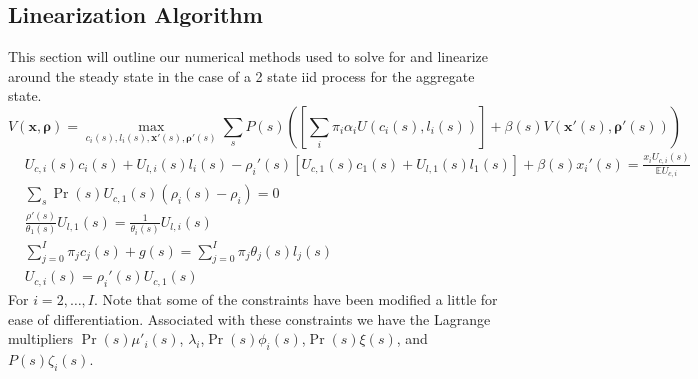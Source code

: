 \documentclass[thmsb,11pt]{article}
\begin{document}
\subsection{Linearization Algorithm}\label{apndx: numerical methods}
This section will outline our numerical methods used to solve for and linearize around the steady state in the case of a 2 state iid process for the aggregate state.
\begin{equation}
	V(\bm x,\bm \rho) = \max_{c_i(s),l_i(s),\bm x'(s),\bm\rho'(s)} \sum_s P(s)\left(\left[\sum_i\pi_i \alpha_i U(c_i(s),l_i(s))\right] + \beta(s) V(\bm x'(s),\bm \rho'(s))\right)\label{eq.obj}
\end{equation}
\begin{subequations}
\begin{align}
	&U_{c,i}(s)c_i(s)+U_{l,i}(s)l_i(s) - \rho_i'(s)\left[U_{c,1}(s)c_1(s)+U_{l,1}(s)l_1(s)\right]+ \beta(s)x_i'(s) = \frac{x_i U_{c,i}(s)}{\mathbb{E} U_{c,i}}\label{eq.imp_con}\\
	&\sum_s \Pr(s) U_{c,1}(s)(\rho_i(s) -\rho_i) = 0\\
	&\frac{\rho'(s)}{\theta_1(s)}U_{l,1}(s) = \frac{1}{\theta_i(s)}U_{l,i}(s)\\
	& \sum_{j=0}^I\pi_j c_j(s)  + g(s) = \sum_{j=0}^{I} \pi_j\theta_j(s)l_j(s)\\
	& U_{c,i}(s) = \rho_i'(s) U_{c,1}(s)\label{eq.rho_con}
\end{align}\end{subequations}  For $i=2,\ldots,I$.  Note that some of the constraints have been modified a little for ease of differentiation.  Associated with these constraints we have the Lagrange multipliers $\Pr(s)\mu'_i(s)$, $\lambda_i$,$\Pr(s)\phi_i(s)$,$\Pr(s)\xi(s)$, and $P(s)\zeta_i(s)$.
\end{document}
